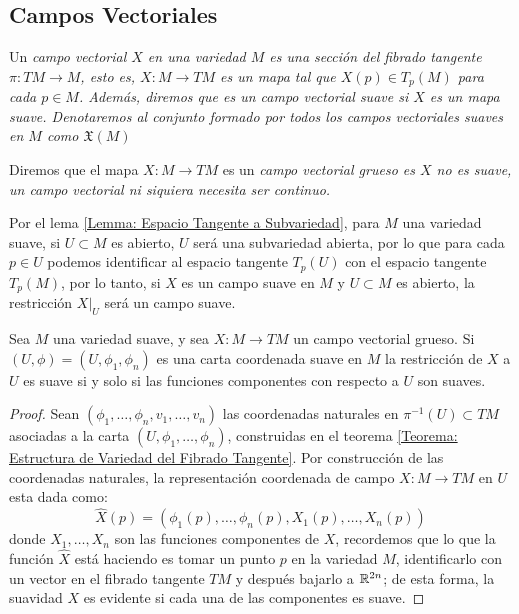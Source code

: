 \subsection{Campos Vectoriales}\label{Subsección: Campos Vectoriales}
\begin{definition}
	Un \it{campo vectorial} $X$ en una variedad $M$ es una sección del fibrado tangente $\pi: TM \to M$, esto es, $X: M \to TM$ es un mapa tal que $X(p) \in T_{p}(M)$ para cada $p \in M$. Además, diremos que es un \it{campo vectorial suave} si $X$ es un mapa suave. Denotaremos al conjunto formado por todos los campos vectoriales suaves en $M$ como $\mathfrak{X}(M)$

	Diremos que el mapa $X: M \to TM$ es un \it{campo vectorial grueso} es $X$ no es suave, un campo vectorial ni siquiera necesita ser continuo.
\end{definition}

Por el lema \ref{Lemma: Espacio Tangente a Subvariedad}, para $M$ una variedad suave, si $U \subset M$ es abierto, $U$ será una subvariedad abierta, por lo que para cada $p \in U$ podemos identificar al espacio tangente $T_p(U)$ con el espacio tangente $T_p(M)$, por lo tanto, si $X$ es un campo suave en $M$ y $U \subset M$ es abierto, la restricción $X|_{U}$ será un campo suave.

\begin{theorem}\label{Teorema: Primer Criterio de Suavidad Para Campos Vectoriales}
	Sea $M$ una variedad suave, y sea $X: M \to TM$ un campo vectorial grueso. Si $(U,\phi) = (U,\phi_1,\phi_n)$ es una carta coordenada suave en $M$ la restricción de $X$ a $U$ es suave si y solo si las funciones componentes con respecto a $U$ son suaves.
\end{theorem}

\begin{proof}
	Sean $(\phi_1,\ldots,\phi_n, v_1, \ldots, v_n)$ las coordenadas naturales en $\pi^{-1}(U) \subset TM$ asociadas a la carta $(U,\phi_1,\ldots,\phi_n)$, construidas en el teorema \ref{Teorema: Estructura de Variedad del Fibrado Tangente}. Por construcción de las coordenadas naturales, la representación coordenada de campo $X: M \to TM$ en $U$ esta dada como:
	\[
		\hat{X}(p) = (\phi_1(p), \ldots, \phi_n(p), X_1(p), \ldots, X_n(p))
	\]
	donde $X_1, \ldots, X_n$ son las funciones componentes de $X$, recordemos que lo que la función $\hat{X}$ está haciendo es tomar un punto $p$ en la variedad $M$, identificarlo con un vector en el fibrado tangente $TM$ y después bajarlo a $\mathbb{R}^{2n}$; de esta forma, la suavidad $X$ es evidente si cada una de las componentes es suave.
\end{proof}

